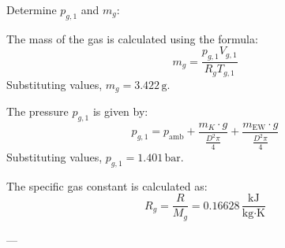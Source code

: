 Determine \( p_{g,1} \) and \( m_g \):  

The mass of the gas is calculated using the formula:  
\[
m_g = \frac{p_{g,1} V_{g,1}}{R_g T_{g,1}}
\]  
Substituting values, \( m_g = 3.422 \, \text{g} \).  

The pressure \( p_{g,1} \) is given by:  
\[
p_{g,1} = p_{\text{amb}} + \frac{m_K \cdot g}{\frac{D^2 \pi}{4}} + \frac{m_{\text{EW}} \cdot g}{\frac{D^2 \pi}{4}}
\]  
Substituting values, \( p_{g,1} = 1.401 \, \text{bar} \).  

The specific gas constant is calculated as:  
\[
R_g = \frac{R}{M_g} = 0.16628 \, \frac{\text{kJ}}{\text{kg·K}}
\]  

---